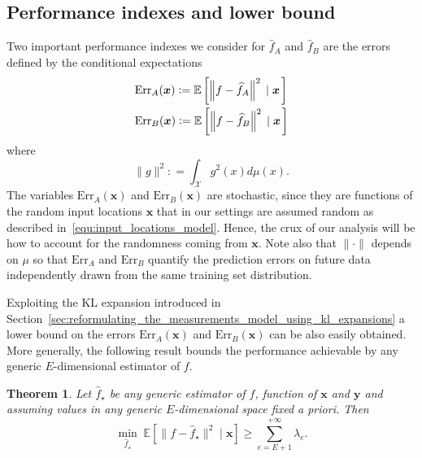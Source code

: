 \documentclass[10pt,twocolumn,twoside]{IEEEtran}					%
\newcounter{generalCounter}
\theoremstyle	{plain}
\newtheorem		{theorem}		[generalCounter]	{Theorem}
\newcommand{\DefinedAs}			[0]	{\mathrel{\mathop:}=}
\newcommand{\Expectation}					[0]	{\mathbb{E}}
\newcommand{\ExpectationOf}					[1]	{\Expectation \left[ #1 \right]}
\newcommand{\ExpectationOfGiven}			[2]	{\ExpectationOf{ #1 \; \left| \; #2 \right. }}
\newcommand	{\Section}				[0]	{Section}
\begin{document}
\subsection{Performance indexes and lower bound}

Two important performance indexes we consider for $\widehat{f}_{A}$ and $\widehat{f}_{B}$ are the errors defined by the conditional expectations
%
\begin{equation}
	\begin{array}{l}
		\displaystyle
		\mathrm{Err}_{A}(\bm{x}) \DefinedAs \ExpectationOfGiven{\left\| f - \widehat{f}_{A} \right\|^{2}}{\bm{x}} \vspace{0.1cm} \\
		\displaystyle
		\mathrm{Err}_{B}(\bm{x}) \DefinedAs \ExpectationOfGiven{\left\| f - \widehat{f}_{B} \right\|^{2}}{\bm{x}}
	\end{array}
	\label{equ:definition_of_Err_A_and_Err_B}
\end{equation}
%
where
%
\begin{equation}
	\| g \|^{2} \DefinedAs \int_{\mathcal{X}} g^2(x) d \mu(x) .
	\label{equ:definition_of_norm_induced_by_mu}
\end{equation}
%
The variables $\mathrm{Err}_{A}(\bm{x})$ and $\mathrm{Err}_{B}(\bm{x})$ are stochastic, since they are functions of the random input locations $\bm{x}$ that in our settings are assumed random as described in~\eqref{equ:input_locations_model}. Hence, the crux of our analysis will be how to account for the randomness coming from $\bm{x}$. Note also that $\| \cdot \|$ depends on $\mu$ so that $\mathrm{Err}_{A}$ and $\mathrm{Err}_{B}$ quantify the prediction errors on future data independently drawn from the same training set distribution.

Exploiting the \ac{KL} expansion introduced in \Section~\ref{sec:reformulating_the_measurements_model_using_kl_expansions} a lower bound on the errors $\mathrm{Err}_{A}(\bm{x})$ and $\mathrm{Err}_{B}(\bm{x})$ can be also easily obtained.
More generally, the following result bounds the performance achievable by any generic 
$E$-dimensional estimator of $f$.
%
\begin{theorem}
	Let $\widehat{f}_{\star}$ be any generic estimator of $f$, function of $\bm{x}$ and $\bm{y}$ and assuming values in any generic $E$-dimensional space fixed a priori. Then 
	\begin{equation}
		\min_{\widehat{f}_{\star}} \;
		\ExpectationOfGiven{\| f - \widehat{f}_{\star} \|^{2}}{\bm{x}} 
		\geq
		\sum_{e = E + 1}^{+\infty} \lambda_{e}.
	\label{equ:Err_lower_bound}
	\end{equation}
	\label{thm:lower_bound_for_generic_estimator_of_f}
\end{theorem}
\end{document}
